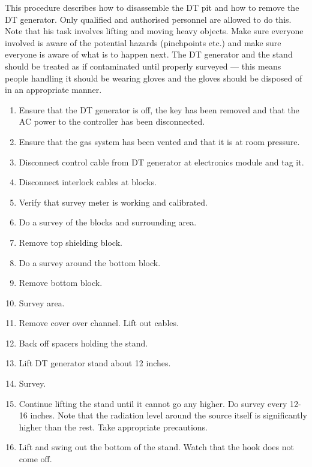 This procedure describes how to disassemble the DT pit and how to remove the DT generator. Only qualified and authorised personnel are allowed to do this. Note that his task involves lifting and moving heavy objects. Make sure everyone involved is aware of the potential hazards (pinchpoints etc.) and make sure everyone is aware of what is to happen next. The DT generator and the stand should be treated as if contaminated until properly surveyed --- this means people handling it should be wearing gloves and the gloves should be disposed of in an appropriate manner. 
\begin{enumerate}
\item \CheckBox[name=dtpdp1]{} Ensure that the DT generator is off, the key has been removed and that the AC power to the controller has been disconnected.
\item \CheckBox[name=dtpdp2]{} Ensure that the gas system has been vented and that it is at room pressure.
\item \CheckBox[name=dtpdp3]{} Disconnect control cable from DT generator at electronics module and tag it.
\item \CheckBox[name=dtpdp4]{} Disconnect interlock cables at blocks.
\item \CheckBox[name=dtpdp5]{} Verify that survey meter is working and calibrated.
\item \CheckBox[name=dtpdp6]{} Do a survey of the blocks and surrounding area.
\item \CheckBox[name=dtpdp7]{} Remove top shielding block.
\item \CheckBox[name=dtpdp8]{} Do a survey around the bottom block.
\item \CheckBox[name=dtpdp9]{} Remove bottom block.
\item \CheckBox[name=dtpdp10]{} Survey area.
\item \CheckBox[name=dtpdp11]{} Remove cover over channel. Lift out cables.
\item \CheckBox[name=dtpdp12]{} Back off spacers holding the stand.
\item \CheckBox[name=dtpdp13]{} Lift DT generator stand about 12 inches.
\item \CheckBox[name=dtpdp14]{} Survey.
\item \CheckBox[name=dtpdp15]{} Continue lifting the stand until it cannot go any higher. Do survey every 12-16 inches. Note that the radiation level around the source itself is significantly higher than the rest. Take appropriate precautions.
\item \CheckBox[name=dtpdp16]{} Lift and swing out the bottom of the stand. Watch that the hook does not come off. 

\end{enumerate}
